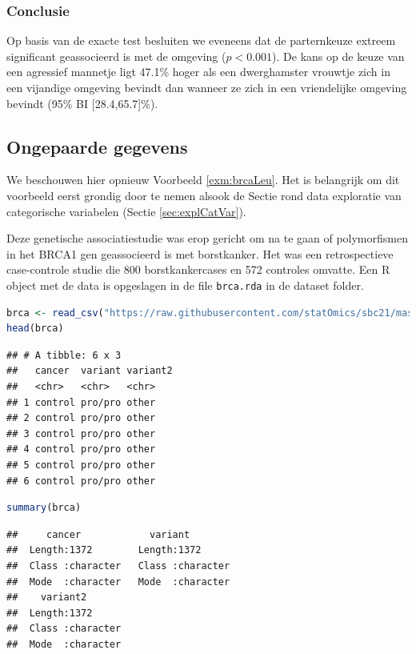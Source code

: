 \documentclass[
  12pt,dutch,coursenotes]{book}
\newcommand{\passthrough}[1]{#1}
\begin{document}
\hypertarget{conclusie-1}{%
\subsubsection{Conclusie}\label{conclusie-1}}

Op basis van de exacte test besluiten we eveneens dat de parternkeuze extreem significant geassocieerd is met de omgeving (\(p<0.001\)).
De kans op de keuze van een agressief mannetje ligt 47.1\% hoger als een dwerghamster vrouwtje zich in een vijandige omgeving bevindt dan wanneer ze zich in een vriendelijke omgeving bevindt (95\% BI {[}28.4,65.7{]}\%).

\hypertarget{subsec:catOnPaired}{%
\subsection{Ongepaarde gegevens}\label{subsec:catOnPaired}}

We beschouwen hier opnieuw Voorbeeld \ref{exm:brcaLeu}.
Het is belangrijk om dit voorbeeld eerst grondig door te nemen alsook de Sectie rond data exploratie van categorische variabelen (Sectie \ref{sec:explCatVar}).

Deze genetische associatiestudie was erop gericht om na te gaan of polymorfismen in het BRCA1 gen geassocieerd is met borstkanker.
Het was een retrospectieve case-controle studie die 800 borstkankercases en 572 controles omvatte.
Een R object met de data is opgeslagen in de file \passthrough{\lstinline!brca.rda!} in de dataset folder.

\begin{lstlisting}[language=R]
brca <- read_csv("https://raw.githubusercontent.com/statOmics/sbc21/master/data/brca.csv")
head(brca)
\end{lstlisting}

\begin{lstlisting}
## # A tibble: 6 x 3
##   cancer  variant variant2
##   <chr>   <chr>   <chr>   
## 1 control pro/pro other   
## 2 control pro/pro other   
## 3 control pro/pro other   
## 4 control pro/pro other   
## 5 control pro/pro other   
## 6 control pro/pro other
\end{lstlisting}

\begin{lstlisting}[language=R]
summary(brca)
\end{lstlisting}

\begin{lstlisting}
##     cancer            variant         
##  Length:1372        Length:1372       
##  Class :character   Class :character  
##  Mode  :character   Mode  :character  
##    variant2        
##  Length:1372       
##  Class :character  
##  Mode  :character
\end{lstlisting}
\end{document}
